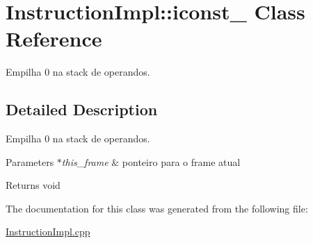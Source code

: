 \hypertarget{class_instruction_impl_1_1iconst__0}{}\section{Instruction\+Impl\+:\+:iconst\+\_ Class Reference}
\label{class_instruction_impl_1_1iconst__0}


Empilha 0 na stack de operandos.  




\subsection{Detailed Description}
Empilha 0 na stack de operandos. 


\begin{DoxyParams}{Parameters}
{\em $\ast$this\+\_\+frame} & ponteiro para o frame atual \\
\hline
\end{DoxyParams}
\begin{DoxyReturn}{Returns}
void 
\end{DoxyReturn}


The documentation for this class was generated from the following file\+:\begin{DoxyCompactItemize}
\item 
\hyperlink{_instruction_impl_8cpp}{Instruction\+Impl.\+cpp}\end{DoxyCompactItemize}
